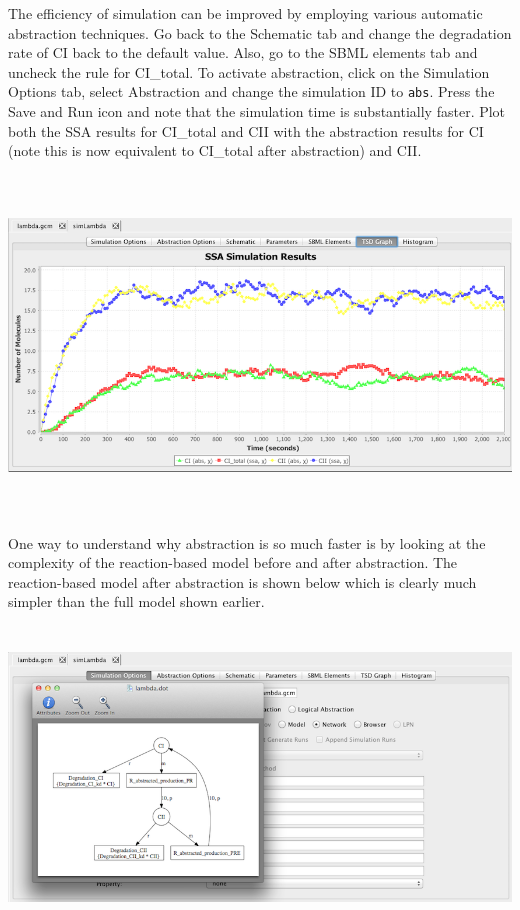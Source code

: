 \documentclass[titlepage,11pt]{article}
\begin{document}
The efficiency of simulation can be improved by employing various automatic abstraction techniques.  Go back to the Schematic tab and change the degradation rate of CI back to the default value.  Also, go to the SBML elements tab and uncheck the rule for CI\_total.  To activate abstraction, click on the Simulation Options tab, select Abstraction and change the simulation ID to {\tt abs}.  Press the Save and Run icon and note that the simulation time is substantially faster.  Plot both the SSA results for CI\_total and CII with the abstraction results for CI (note this is now equivalent to CI\_total after abstraction) and CII.

\begin{center}
\includegraphics[height=90mm]{screenshots/absResults}
\end{center}

One way to understand why abstraction is so much faster is by looking at the complexity of the reaction-based model before and after abstraction.  The reaction-based model after abstraction is shown below which is clearly much simpler than the full model shown earlier.

\begin{center}
\includegraphics[height=80mm]{screenshots/viewNetworkAbs}
\end{center}
\end{document}
